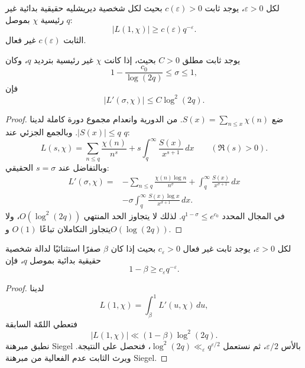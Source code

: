 \begin{theorem}
\label{thm:chapter11-siegel}
لكل \(\varepsilon>0\)، يوجد ثابت \(c(\varepsilon)>0\) بحيث لكل شخصية
ديريشليه حقيقية بدائية غير رئيسية \(\chi\) بموصل \(q\):
\[
|L(1,\chi)|\ge c(\varepsilon)q^{-\varepsilon}.
\tag{11.6}
\]
الثابت \(c(\varepsilon)\) غير فعال.
\end{theorem}

\begin{lemma}
\label{lem:chapter11-derivative-near-one}
\provedhere
يوجد ثابت مطلق \(C>0\) بحيث، إذا كانت \(\chi\) غير رئيسية بترديد \(q\)،
وكان
\[
1-\frac{c_0}{\log(2q)}\le\sigma\le1,
\]
فإن
\[
|L'(\sigma,\chi)|\le C\log^2(2q).
\]
\end{lemma}

\begin{proof}
ضع \(S(x)=\sum_{n\le x}\chi(n)\). من الدورية وانعدام مجموع دورة كاملة
لدينا \(|S(x)|\le q\). وبالجمع الجزئي عند \(q\):
\[
L(s,\chi)=
\sum_{n\le q}\frac{\chi(n)}{n^s}+
 s\int_q^\infty\frac{S(x)}{x^{s+1}}\,dx
\qquad(\Re(s)>0).
\]
وبالتفاضل عند \(s=\sigma\) الحقيقي:
\begin{align*}
L'(\sigma,\chi)={}&-
\sum_{n\le q}\frac{\chi(n)\log n}{n^\sigma}+
\int_q^\infty\frac{S(x)}{x^{\sigma+1}}\,dx\\
&-
\sigma\int_q^\infty
\frac{S(x)\log x}{x^{\sigma+1}}\,dx.
\end{align*}
في المجال المحدد \(q^{1-\sigma}\le e^{c_0}\). لذلك لا يتجاوز الحد
المنتهي \(O(\log^2(2q))\)، ولا يتجاوز التكاملان تباعًا
\(O(1)\) و\(O(\log(2q))\).
\end{proof}

\begin{corollary}
\label{cor:chapter11-siegel-zero-distance}
\provedhere
لكل \(\varepsilon>0\)، يوجد ثابت غير فعال \(c_\varepsilon>0\) بحيث إذا
كان \(\beta\) صفرًا استثنائيًا لدالة شخصية حقيقية بدائية بموصل \(q\)، فإن
\[
1-\beta\ge c_\varepsilon q^{-\varepsilon}.
\]
\end{corollary}

\begin{proof}
لدينا
\[
L(1,\chi)=\int_\beta^1L'(u,\chi)\,du,
\]
فتعطي اللمّة السابقة
\[
|L(1,\chi)|\ll(1-\beta)\log^2(2q).
\]
نطبق مبرهنة Siegel بالأس \(\varepsilon/2\)، ثم نستعمل
\(\log^2(2q)\ll_\varepsilon q^{\varepsilon/2}\)، فنحصل على النتيجة. ويرث
الثابت عدم الفعالية من مبرهنة Siegel.
\end{proof}

